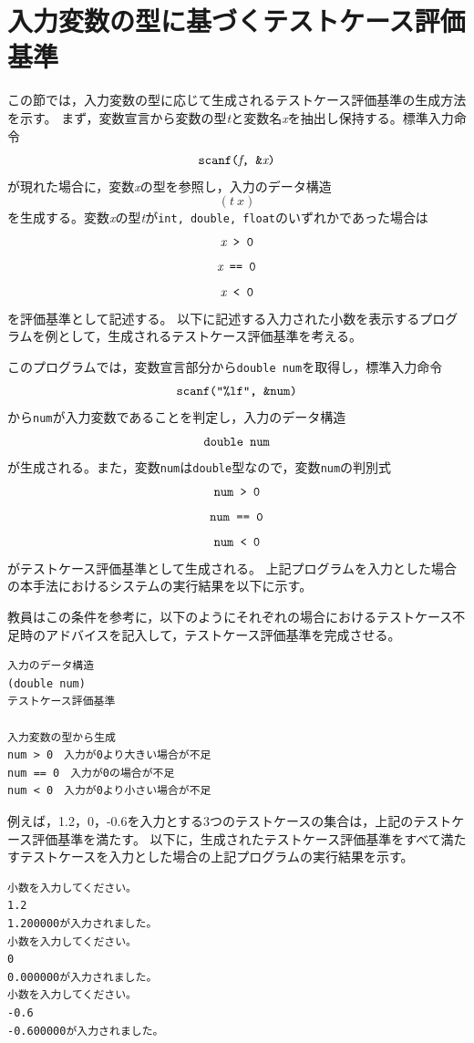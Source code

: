 \documentclass{tpu-sotu}
\begin{document}
\section{入力変数の型に基づくテストケース評価基準}
この節では，入力変数の型に応じて生成されるテストケース評価基準の生成方法を示す。
まず，変数宣言から変数の型{\it t}と変数名{\it x}を抽出し保持する。標準入力命令\\
\[ 
\mbox{{\tt {scanf({\it f}, \&{\it x})}}}
\]
が現れた場合に，変数{\it x}の型を参照し，入力のデータ構造\\
\[
(t\:x)
\]
を生成する。変数{\it x}の型{\it t}が{\tt int, double, float}のいずれかであった場合は\\
\[ 
\mbox{\tt{{\it x} > 0}} 
\]
\[
\mbox{\tt{{\it x} == 0}}
\]
\[
\mbox{\tt{{\it x} < 0}}
\]
を評価基準として記述する。
以下に記述する入力された小数を表示するプログラムを例として，生成されるテストケース評価基準を考える。

このプログラムでは，変数宣言部分から{\tt double num}を取得し，標準入力命令\\
\[ 
\mbox{{\tt {scanf("\%lf", \&num)}}}
\]
から{\tt num}が入力変数であることを判定し，入力のデータ構造\\
\[
\mbox{{\tt double num}}
\]
が生成される。また，変数{\tt num}は{\tt double}型なので，変数{\tt num}の判別式\\
\[ 
\mbox{\tt{num > 0}} 
\]
\[
\mbox{\tt{num == 0}}
\]
\[
\mbox{\tt{num < 0}}
\]
がテストケース評価基準として生成される。
上記プログラムを入力とした場合の本手法におけるシステムの実行結果を以下に示す。

教員はこの条件を参考に，以下のようにそれぞれの場合におけるテストケース不足時のアドバイスを記入して，テストケース評価基準を完成させる。
\begin{lstlisting}[xleftmargin=1cm]
入力のデータ構造
(double num)
テストケース評価基準

入力変数の型から生成
num > 0　入力が0より大きい場合が不足
num == 0　入力が0の場合が不足
num < 0　入力が0より小さい場合が不足
\end{lstlisting}
例えば，1.2，0，-0.6を入力とする3つのテストケースの集合は，上記のテストケース評価基準を満たす。
以下に，生成されたテストケース評価基準をすべて満たすテストケースを入力とした場合の上記プログラムの実行結果を示す。
\begin{lstlisting}[xleftmargin=1cm]
小数を入力してください。
1.2
1.200000が入力されました。
小数を入力してください。
0
0.000000が入力されました。
小数を入力してください。
-0.6
-0.600000が入力されました。
\end{lstlisting}
\end{document}
